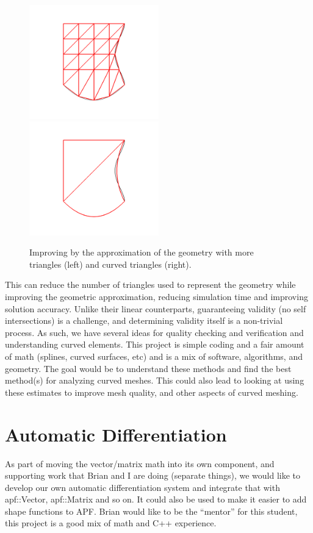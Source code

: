 \documentclass[12pt]{article}
\begin{document}
\begin{figure}
\includegraphics[width=0.5\textwidth]{images/uniform2.png}
\includegraphics[width=0.5\textwidth]{images/curved3.png}
\label{fig:endcurv}
\caption{Improving by the approximation of the geometry with more triangles (left) and curved triangles (right).}
\end{figure}
This can reduce the number of triangles used to represent the geometry while
improving the geometric approximation, reducing simulation time and improving
solution accuracy. Unlike their linear counterparts, guaranteeing validity (no
self intersections) is a challenge, and determining validity itself is a
non-trivial process. As such, we have several ideas for quality checking and
verification and understanding curved elements. This project is simple coding
and a fair amount of math (splines, curved surfaces, etc) and is a mix of
software, algorithms, and geometry. The goal would be to understand these
methods and find the best method(s) for analyzing curved meshes. This could also
lead to looking at using these estimates to improve mesh quality, and other
aspects of curved meshing.
\section{Automatic Differentiation} 
As part of moving the vector/matrix math into its own component, and supporting
work that Brian and I are doing (separate things), we would like to develop our
own automatic differentiation system and integrate that with apf::Vector,
apf::Matrix and so on. It could also be used to make it easier to add shape
functions to APF. Brian would like to be the “mentor” for this student, this
project is a good mix of math and C++ experience.
\end{document}
